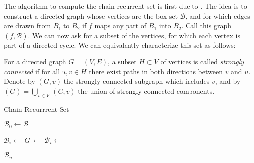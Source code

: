 The algorithm to compute the chain recurrent set is first due to \cite*{chain}. The idea 
is to construct a directed graph whose vertices are the box set $\mathcal{B}$, and for 
which edges are drawn from $B_1$ to $B_2$ if $f$ maps any part of $B_1$ into $B_2$. 
Call this graph $(f, \mathcal{B})$. We can now ask for a subset of the 
vertices, for which each vertex is part of a directed cycle. We can equivalently 
characterize this set as follows:

\begin{definition}
    \cite*{dynbook} For a directed graph $G = (V, E)$, a subset $H \subset V$ of vertices 
    is called \emph{strongly connected} if for all $u, v \in H$ there exist paths in both 
    directions between $v$ and $u$. Denote by $(G, v)$ the strongly connected
    subgraph which includes $v$, and by 
    $(G) = \bigcup_{v \in V}\,$$(G, v)$ 
    the union of strongly connected components.
\end{definition}

\begin{algorithm}
    \caption{Chain Recurrrent Set}
    \label{alg:chain}

    \begin{algorithmic}[1]
        \State $\mathcal{B}_0 \gets \mathcal{B}$

            \State $\mathcal{B}_i \gets$ 
            \State $G\, \gets$ 
            \State $\mathcal{B}_i \gets$ 
        \EndFor

        \State \Return $\mathcal{B}_n$
    \end{algorithmic}
\end{algorithm}

